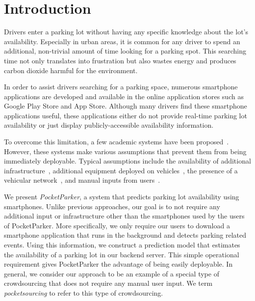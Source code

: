 \section{Introduction}

Drivers enter a parking lot without having any specific knowledge about the
lot's availability. Especially in urban areas, it is common for any driver to
spend an additional, non-trivial amount of time looking for a parking spot. This
searching time not only translates into frustration but also wastes energy and
produces carbon dioxide harmful for the environment.

In order to assist drivers searching for a parking space, numerous smartphone
applications are developed and available in the online application stores such
as Google Play Store and App Store. Although many drivers find these smartphone
applications useful, these applications either do not provide real-time parking
lot availability or just display publicly-accessible availability information.

To overcome this limitation, a few academic systems have been
proposed~\cite{4212497, Chen:2012:COS, Delot:2009:CRP, 5062057,
Mathur:2010:PDS}. However, these systems make various assumptions that prevent
them from being immediately deployable. Typical assumptions include the
availability of additional infrastructure~\cite{5062057}, additional equipment
deployed on vehicles~\cite{Mathur:2010:PDS}, the presence of a vehicular
network~\cite{Delot:2009:CRP, Mathur:2010:PDS, 4212497}, and manual inputs from
users~\cite{Chen:2012:COS}.

We present {\it PocketParker}, a system that predicts parking lot availability
using smartphones. Unlike previous approaches, our goal is to not require any
additional input or infrastructure other than the smartphones used by the users
of PocketParker. More specifically, we only require our users to download a
smartphone application that runs in the background and detects parking related
events. Using this information, we construct a prediction model that estimates
the availability of a parking lot in our backend server. This simple operational
requirement gives PocketParker the advantage of being easily deployable. In
general, we consider our approach to be an example of a special type of
crowdsourcing that does not require any manual user input. We term {\it
pocketsourcing} to refer to this type of crowdsourcing.

